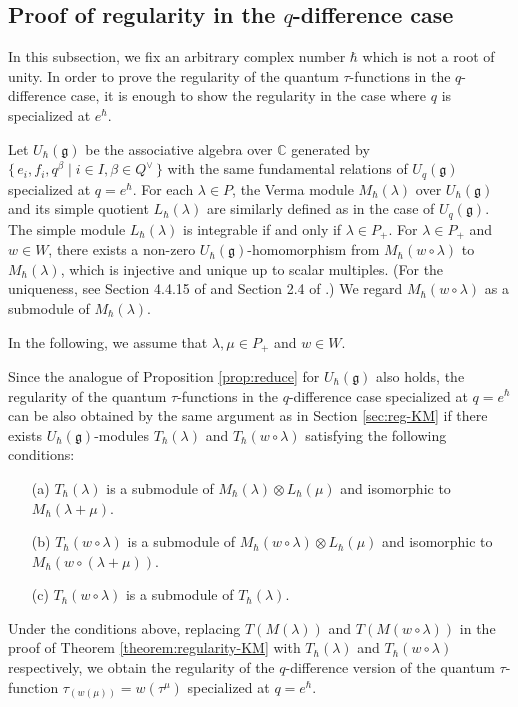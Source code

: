 \documentclass[12pt,twoside]{article}
\newcommand\Qv{Q^\vee}
\newcommand\g{{\mathfrak g}}
\newcommand\C{{\mathbb C}} %
\theoremstyle{plain} %
\theoremstyle{definition} %
\theoremstyle{definition} %
\numberwithin{theorem}{section}
\numberwithin{equation}{section}
\numberwithin{figure}{section}
\numberwithin{table}{section}
\newcommand\secref[1]{Section \ref{#1}}
\newcommand\theoremref[1]{Theorem \ref{#1}}
\newcommand\propref[1]{Proposition \ref{#1}}
\begin{document}
\subsection{Proof of regularity in the $q$-difference case}
\label{sec:reg-q}

In this subsection, we fix an arbitrary complex number $\hbar$ which is not a root of unity.
In order to prove the regularity of the quantum $\tau$-functions
in the $q$-difference case, it is enough to show 
the regularity in the case where $q$ is specialized at $e^\hbar$.

Let $U_\hbar(\g)$ be the associative algebra over $\C$ generated by 
$\{\,e_i,f_i,q^\beta\mid i\in I, \beta\in\Qv \,\}$ with the same fundamental
relations of $U_q(\g)$ specialized at $q=e^\hbar$. 
For each $\lambda\in P$, the Verma module $M_\hbar(\lambda)$ over $U_\hbar(\g)$ and 
its simple quotient $L_\hbar(\lambda)$ are similarly defined 
as in the case of $U_q(\g)$.
The simple module $L_\hbar(\lambda)$ is integrable if and only if $\lambda\in P_+$.
For $\lambda\in P_+$ and $w\in W$, there exists a non-zero $U_\hbar(\g)$-homomorphism 
from $M_\hbar(w\circ\lambda)$ to $M_\hbar(\lambda)$,  
which is injective and unique up to scalar multiples.
(For the uniqueness, 
see Section 4.4.15 of \cite{Jos-1995} and Section 2.4 of \cite{HK-2007}.)
We regard $M_\hbar(w\circ\lambda)$ as a submodule of $M_\hbar(\lambda)$.

In the following, we assume that $\lambda,\mu\in P_+$ and $w\in W$.

Since the analogue of \propref{prop:reduce} for $U_\hbar(\g)$ also holds,
the regularity of the quantum $\tau$-functions in the $q$-difference case
specialized at $q=e^\hbar$ can be also obtained by the same argument 
as in \secref{sec:reg-KM} 
if there exists $U_\hbar(\g)$-modules $T_\hbar(\lambda)$ and $T_\hbar(w\circ\lambda)$
satisfying the following conditions:
\begin{enumerate}
\item[(a)] $T_\hbar(\lambda)$ is a submodule 
  of $M_\hbar(\lambda)\otimes L_\hbar(\mu)$
  and isomorphic to $M_\hbar(\lambda+\mu)$.
\item[(b)] $T_\hbar(w\circ\lambda)$ is a submodule 
  of $M_\hbar(w\circ\lambda)\otimes L_\hbar(\mu)$
  and isomorphic to $M_\hbar(w\circ(\lambda+\mu))$.
\item[(c)] $T_\hbar(w\circ\lambda)$ is a submodule of $T_\hbar(\lambda)$.
\end{enumerate}
Under the conditions above, replacing $T(M(\lambda))$ and $T(M(w\circ\lambda))$
in the proof of \theoremref{theorem:regularity-KM} 
with $T_\hbar(\lambda)$ and $T_\hbar(w\circ\lambda)$ respectively, 
we obtain the regularity of the $q$-difference version of 
the quantum $\tau$-function $\tau_{(w(\mu))}=w(\tau^\mu)$ specialized at $q=e^\hbar$.
\end{document}
